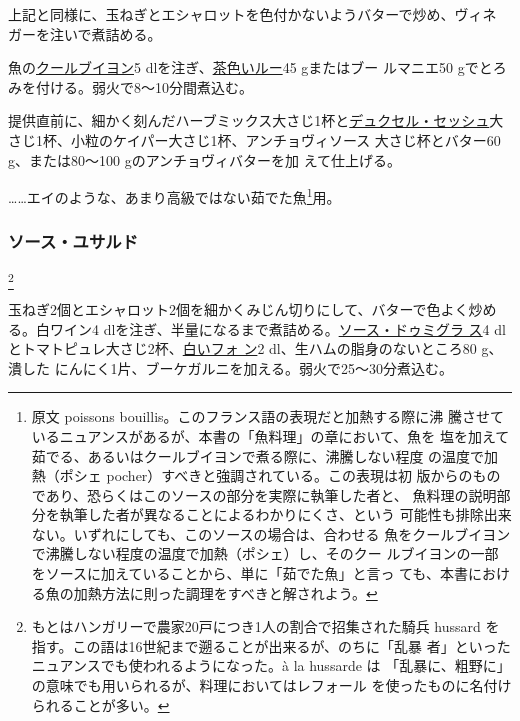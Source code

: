 \begin{recette}
上記と同様に、玉ねぎとエシャロットを色付かないようバターで炒め、ヴィネ
ガーを注いで煮詰める。

魚の\protect\hyperlink{courts-bouillons-de-poisson}{クールブイヨン}5
dlを注ぎ、\protect\hyperlink{roux-brun}{茶色いルー}45 gまたはブー
ルマニエ50 gでとろみを付ける。弱火で8〜10分間煮込む。

提供直前に、細かく刻んだハーブミックス大さじ1杯と\protect\hyperlink{duxelles-seche}{デュクセル・セッシュ}大
さじ1\undemi{}杯、小粒のケイパー大さじ1\undemi{}杯、アンチョヴィソース
大さじ\undemi{}杯とバター60 g、または80〜100 gのアンチョヴィバターを加
えて仕上げる。

\ldots{}\ldots{}エイのような、あまり高級ではない茹でた魚\footnote{原文
  poissons bouillis。このフランス語の表現だと加熱する際に沸
  騰させているニュアンスがあるが、本書の「魚料理」の章において、魚を
  塩を加えて茹でる、あるいはクールブイヨンで煮る際に、沸騰しない程度
  の温度で加熱（ポシェ pocher）すべきと強調されている。この表現は初
  版からのものであり、恐らくはこのソースの部分を実際に執筆した者と、
  魚料理の説明部分を執筆した者が異なることによるわかりにくさ、という
  可能性も排除出来ない。いずれにしても、このソースの場合は、合わせる
  魚をクールブイヨンで沸騰しない程度の温度で加熱（ポシェ）し、そのクー
  ルブイヨンの一部をソースに加えていることから、単に「茹でた魚」と言っ
  ても、本書における魚の加熱方法に則った調理をすべきと解されよう。}用。

\hypertarget{sauce-hussarde}{%
\subsubsection{ソース・ユサルド}\label{sauce-hussarde}}

\footnote{もとはハンガリーで農家20戸につき1人の割合で招集された騎兵
  hussard を指す。この語は16世紀まで遡ることが出来るが、のちに「乱暴
  者」といったニュアンスでも使われるようになった。à la hussarde は
  「乱暴に、粗野に」の意味でも用いられるが、料理においてはレフォール
  を使ったものに名付けられることが多い。}


玉ねぎ2個とエシャロット2個を細かくみじん切りにして、バターで色よく炒め
る。白ワイン4
dlを注ぎ、半量になるまで煮詰める。\protect\hyperlink{sauce-demi-glace}{ソース・ドゥミグラ
ス}4 dlとトマトピュレ大さじ2杯、\protect\hyperlink{fonds-blanc}{白いフォ
ン}2 dl、生ハムの脂身のないところ80 g、潰した
にんにく1片、ブーケガルニを加える。弱火で25〜30分煮込む。


\end{recette}

